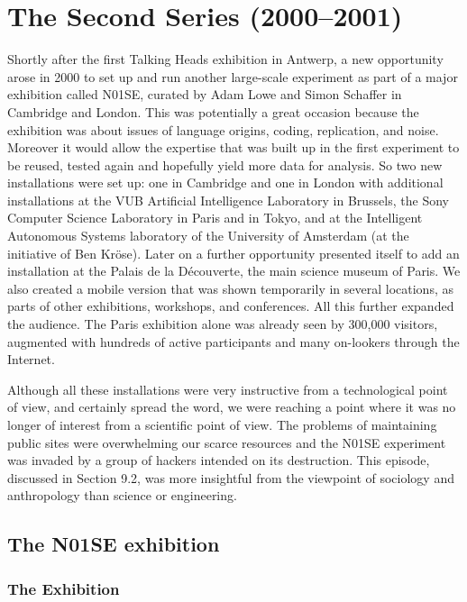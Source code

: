 \chapter{The Second Series (2000--2001)}
\label{c:n01se}

Shortly after the first Talking Heads exhibition in Antwerp, a new opportunity arose in 2000 to set up and run another
large-scale experiment as part of a major exhibition called N01SE, curated by Adam Lowe and Simon Schaffer in Cambridge
and London. This was potentially 
a great occasion because the exhibition was about issues of language origins, coding, replication, 
and noise. Moreover it would allow the expertise that was built up in the first experiment to be reused, 
tested again and hopefully yield more data for analysis. So two new installations were set up: one in 
Cambridge and one in London with additional installations at the VUB Artificial Intelligence 
Laboratory in Brussels, the Sony Computer Science Laboratory in Paris and in Tokyo, and at the 
Intelligent Autonomous Systems laboratory of the University of Amsterdam (at the initiative of Ben Kr\"{o}se). 
Later on a further opportunity presented itself to add an installation at the 
Palais de la D\'{e}couverte, the main science museum of Paris. 
We also created a mobile version that was shown temporarily in several locations, as parts of 
other exhibitions, workshops, and conferences.  All this further expanded the 
audience. The Paris exhibition alone was already seen 
by 300,000 visitors, augmented with hundreds of active participants and many on-lookers through the Internet. 

Although all these installations were very instructive from a technological point of view, and certainly spread 
the word, we were reaching a point where it was no longer of interest from a scientific point of view. The problems 
of maintaining public sites were overwhelming our scarce resources
and the N01SE experiment was invaded by a group of hackers intended
on its destruction. This episode, discussed in Section 9.2, was more insightful from the viewpoint of sociology 
and anthropology than science or engineering. 

\section{The N01SE exhibition} 

\subsection{The Exhibition} 

